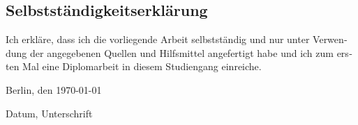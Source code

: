 \cleardoublepage
\begin{otherlanguage}{ngerman}
\chapter{Selbstständigkeitserklärung}
Ich erkläre, dass ich die vorliegende Arbeit selbstständig und nur unter Verwendung der angegebenen Quellen und Hilfsmittel angefertigt habe und ich zum ersten Mal eine Diplomarbeit in diesem Studiengang einreiche.

Berlin, den \today
\begin{flushright}
Datum, Unterschrift
\end{flushright}
\end{otherlanguage}